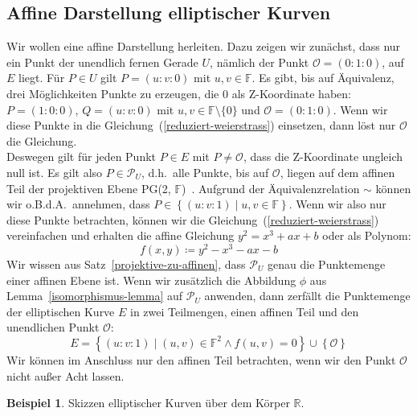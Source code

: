 \documentclass[hidelinks]{article}
\theoremstyle{plain}
\theoremstyle{definition}
\newtheorem{bsp}[thm]{Beispiel}
\theoremstyle{rem}
\newcommand{\pgtwo}{PG(2, $\mathbb{F}$)\ }
\newcommand{\fnz}{\mathbb{F}\setminus\{0\}}
\newcommand{\pu}{\mathcal{P}_U}
\newcommand{\patinf}{\mathcal{O}}
\begin{document}
\begin{sloppypar}
\subsection{Affine Darstellung elliptischer Kurven} \label{affine-darstellung}
Wir wollen eine affine Darstellung herleiten. Dazu zeigen wir zunächst, dass nur ein Punkt der unendlich fernen Gerade $U$, nämlich der Punkt $\patinf = (0:1:0)$, auf $E$ liegt.
Für $P \in U$ gilt $P = (u:v:0)$ mit $u,v \in \mathbb{F}$. Es gibt, bis auf Äquivalenz, drei Möglichkeiten Punkte zu erzeugen, die 0 als Z-Koordinate haben: $P = (1:0:0)$, $Q = (u:v:0)$ mit $u,v \in \fnz$ und $\patinf = (0:1:0)$. 
Wenn wir diese Punkte in die Gleichung~(\ref{reduziert-weierstrass}) einsetzen, dann löst nur $\patinf$ die Gleichung. \\ 
Deswegen gilt für jeden Punkt $P \in E$ mit $P \neq \patinf$, dass die Z-Koordinate ungleich null ist. Es gilt also $P \in \pu$, d.h.\ alle Punkte, bis auf $\patinf$, liegen auf dem affinen Teil der projektiven Ebene \pgtwo. 
Aufgrund der Äquivalenzrelation $\sim$ können wir o.B.d.A.\ annehmen, dass $P \in \left\{(u:v:1) \mid u,v \in \mathbb{F} \right\}$. Wenn wir also nur diese Punkte betrachten, können wir die Gleichung~(\ref{reduziert-weierstrass}) vereinfachen und erhalten die affine Gleichung $y^2 = x^3 + ax + b$ oder als Polynom: 
\begin{equation} \label{affines-polynom}
    f(x,y) \coloneqq y^2 - x^3 - ax - b
\end{equation}
Wir wissen aus Satz~\ref{projektive-zu-affinen}, dass $\pu$ genau die Punktemenge einer affinen Ebene ist. Wenn wir zusätzlich die Abbildung $\phi$ aus Lemma~\ref{isomorphismus-lemma} auf $\pu$ anwenden, dann zerfällt die Punktemenge der elliptischen Kurve $E$ in zwei Teilmengen, einen affinen Teil und den unendlichen Punkt $\patinf$:
\begin{equation*}
    E = \left\{(u:v:1) \mid (u,v) \in \mathbb{F}^2 \land f(u,v) = 0 \right\} \cup \left\{ \patinf \right\}
\end{equation*}
Wir können im Anschluss nur den affinen Teil betrachten, wenn wir den Punkt $\patinf$ nicht außer Acht lassen.
\begin{bsp}
    Skizzen elliptischer Kurven über dem Körper $\mathbb{R}$.
    \begin{figure}[H]
        \centering
        \subfloat[$y^2=x^3 + 0.5x + 2$]{
            \begin{tikzpicture}
                \begin{axis}[
                    axis equal, 
                    scale=0.8
                    ]

\end{axis}
\end{tikzpicture}}
\end{figure}
\end{bsp}
\end{sloppypar}
\end{document}
